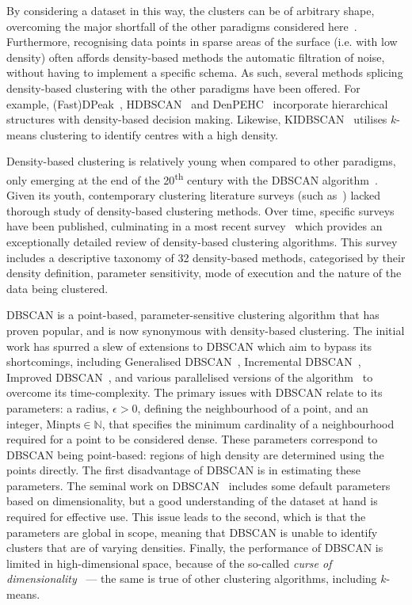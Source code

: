 By considering a dataset in this way, the clusters can be of arbitrary shape,
overcoming the major shortfall of the other paradigms considered
here~\cite{Raykov2016}. Furthermore, recognising data points in sparse areas of
the surface (i.e. with low density) often affords density-based methods the
automatic filtration of noise, without having to implement a specific schema. As
such, several methods splicing density-based clustering with the other paradigms
have been offered. For example, (Fast)DPeak~\cite{Chen2020},
HDBSCAN~\cite{Campello2013} and DenPEHC~\cite{Xu2016} incorporate hierarchical
structures with density-based decision making. Likewise,
KIDBSCAN~\cite{Tsai2006} utilises \(k\)-means clustering to identify centres
with a high density.

Density-based clustering is relatively young when compared to other paradigms,
only emerging at the end of the 20\textsuperscript{th} century with the DBSCAN
algorithm~\cite{Ester1996}. Given its youth, contemporary clustering literature
surveys (such as~\cite{Jain1999,Xu2005}) lacked thorough study of density-based
clustering methods. Over time, specific surveys have been published, culminating
in a most recent survey~\cite{Bhattacharjee2020} which provides an exceptionally
detailed review of density-based clustering algorithms. This survey includes a
descriptive taxonomy of 32 density-based methods, categorised by their density
definition, parameter sensitivity, mode of execution and the nature of the data
being clustered.

DBSCAN is a point-based, parameter-sensitive clustering algorithm that has
proven popular, and is now synonymous with density-based clustering. The initial
work has spurred a slew of extensions to DBSCAN which aim to bypass its
shortcomings, including Generalised DBSCAN~\cite{Sander1998}, Incremental
DBSCAN~\cite{Bakr2015,Ester1998}, Improved DBSCAN~\cite{Borah2004}, and various
parallelised versions of the algorithm~\cite{Bohm2009,He2011,Loh2014,Xu2002} to
overcome its time-complexity. The primary issues with DBSCAN relate to its
parameters: a radius, \(\epsilon > 0\), defining the neighbourhood of a point,
and an integer, \(\text{Minpts} \in \mathbb N\), that specifies the minimum
cardinality of a neighbourhood required for a point to be considered dense.
These parameters correspond to DBSCAN being point-based: regions of high density
are determined using the points directly. The first disadvantage of DBSCAN is in
estimating these parameters. The seminal work on DBSCAN~\cite{Ester1996}
includes some default parameters based on dimensionality, but a good
understanding of the dataset at hand is required for effective use. This issue
leads to the second, which is that the parameters are global in scope, meaning
that DBSCAN is unable to identify clusters that are of varying densities.
Finally, the performance of DBSCAN is limited in high-dimensional space, because
of the so-called \emph{curse of dimensionality}~\cite{Keogh2017} --- the same is
true of other clustering algorithms, including \(k\)-means.

